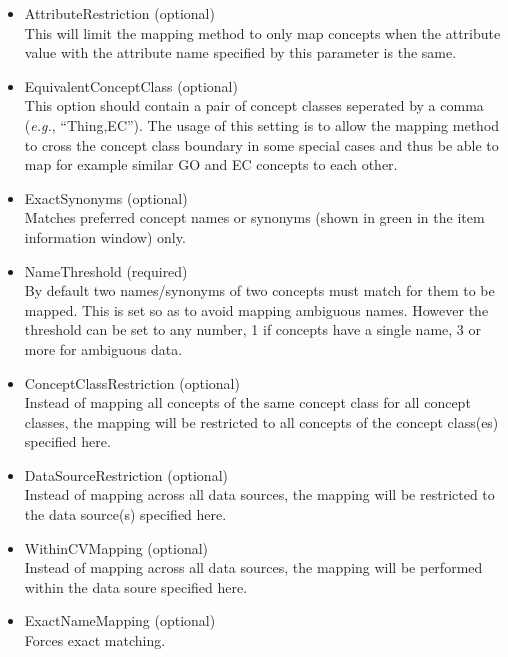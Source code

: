 \begin{itemize}
  
  \item{AttributeRestriction (optional)}\\
  This will limit the mapping method to only map concepts when the attribute value with the attribute name
  specified by this parameter is the same.
  
  \item{EquivalentConceptClass (optional)}\\
  This option should contain a pair of concept classes seperated by a comma ({\it{e.g.}}, ``Thing,EC'').
  The usage of this setting is to allow the mapping method to cross the concept class boundary in some special cases
  and thus be able to map for example similar GO and EC concepts to each other.
  
  \item{ExactSynonyms (optional)}\\
  Matches preferred concept names or synonyms (shown in green in the item information window) only.
  
  \item{NameThreshold (required)}\\
  By default two names/synonyms of two concepts must match for them to be mapped.
  This is set so as to avoid mapping ambiguous names.
  However the threshold can be set to any number, 1 if concepts have a single name, 3 or more for ambiguous data.
  
  \item{ConceptClassRestriction (optional)}\\
  Instead of mapping all concepts of the same concept class for all concept classes, 
  the mapping will be restricted to all concepts of the concept class(es) specified here.
  
  \item{DataSourceRestriction (optional)}\\
  Instead of mapping across all data sources, the mapping will be restricted to the data source(s) specified here.
  
  \item{WithinCVMapping (optional)}\\
  Instead of mapping across all data sources, the mapping will be performed within the data soure specified here.
  
  \item{ExactNameMapping (optional)}\\
  Forces exact matching.

\end{itemize}
    
